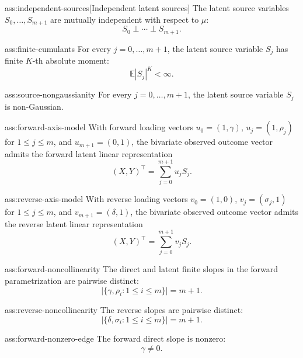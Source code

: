 \begin{assumptionv}{ass:independent-sources}[Independent latent sources]
The latent source variables \(S_0,\ldots,S_{m+1}\) are mutually independent with respect to \(\mu\):
\[
S_0\perp\cdots\perp S_{m+1}.
\]
\end{assumptionv}

\begin{assumptionv}{ass:finite-cumulants}
For every \(j=0,\ldots,m+1\), the latent source variable \(S_j\) has finite \(K\)-th absolute moment:
\[
\mathbb E |S_j|^K<\infty .
\]
\end{assumptionv}

\begin{assumptionv}{ass:source-nongaussianity}
For every \(j=0,\ldots,m+1\), the latent source variable \(S_j\) is non-Gaussian.
\end{assumptionv}

\begin{assumptionv}{ass:forward-axis-model}
With forward loading vectors \(u_0=(1,\gamma)\), \(u_j=(1,\rho_j)\) for \(1\le j\le m\), and \(u_{m+1}=(0,1)\), the bivariate observed outcome vector admits the forward latent linear representation
\[
(X,Y)^\top=\sum_{j=0}^{m+1} u_j S_j .
\]
\end{assumptionv}

\begin{assumptionv}{ass:reverse-axis-model}
With reverse loading vectors \(v_0=(1,0)\), \(v_j=(\sigma_j,1)\) for \(1\le j\le m\), and \(v_{m+1}=(\delta,1)\), the bivariate observed outcome vector admits the reverse latent linear representation
\[
(X,Y)^\top=\sum_{j=0}^{m+1} v_j S_j .
\]
\end{assumptionv}

\begin{assumptionv}{ass:forward-noncollinearity}
The direct and latent finite slopes in the forward parametrization are pairwise distinct:
\[
\bigl|\{\gamma,\rho_i:1\le i\le m\}\bigr|=m+1 .
\]
\end{assumptionv}

\begin{assumptionv}{ass:reverse-noncollinearity}
The reverse slopes are pairwise distinct:
\[
\left|\{\delta,\sigma_i:1\le i\le m\}\right|=m+1.
\]
\end{assumptionv}

\begin{assumptionv}{ass:forward-nonzero-edge}
The forward direct slope is nonzero:
\[
\gamma\ne 0.
\]
\end{assumptionv}

